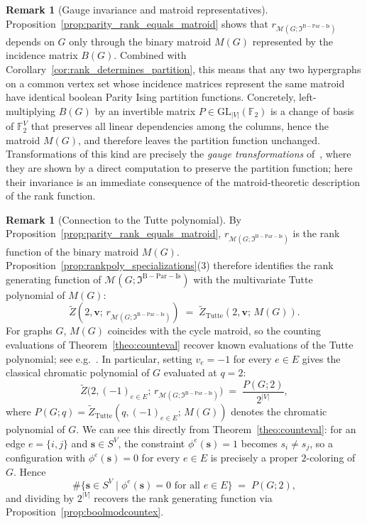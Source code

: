 \documentclass[11pt,reqno]{amsart}
\newcommand{\vecs}{\boldsymbol{s}}
\newcommand{\vecv}{\boldsymbol{v}}
\newcommand{\Mo}{\mathcal{M}}
\newcommand{\mcib}{\mathfrak{I}^{\mathrm{B-Par-Is}}}
\theoremstyle{plain}
\theoremstyle{definition}
\newtheorem{remark}[theorem]{Remark}
\numberwithin{equation}{section}
\begin{document}
\begin{remark}[Gauge invariance and matroid representatives]
\label{rem:gauge}
Proposition~\ref{prop:parity_rank_equals_matroid} shows that
$r_{\Mo(G; \mcib)}$ depends on $G$ only through the binary matroid $M(G)$ represented by the incidence matrix $B(G)$. Combined with Corollary~\ref{cor:rank_determines_partition}, this means that any two hypergraphs on a common vertex set whose incidence matrices represent the same matroid have identical boolean Parity Ising partition functions. Concretely, left-multiplying $B(G)$ by an invertible matrix $P \in \mathrm{GL}_{|V|}(\mathbb{F}_2)$ is a change of basis of $\mathbb{F}_2^{V}$ that preserves all linear dependencies among the columns, hence the matroid $M(G)$, and therefore leaves the partition function unchanged. Transformations of this kind are precisely the \emph{gauge transformations} of~\cite{spinmod}, where they are shown by a direct computation to preserve the partition function; here their invariance is an immediate consequence of the matroid-theoretic
description of the rank function. 
\end{remark}

\begin{remark}[Connection to the Tutte polynomial]
\label{rem:parity_tutte}
By Proposition~\ref{prop:parity_rank_equals_matroid}, $r_{\Mo(G; \mcib)}$ is the rank function of the binary matroid $M(G)$. Proposition~\ref{prop:rankpoly_specializations}(3) therefore identifies the rank generating function of $\Mo(G; \mcib)$ with the multivariate Tutte polynomial of $M(G)$:
\[
    \widetilde Z(2, \vecv;\, r_{\Mo(G; \mcib)})
    \;=\;
    \widetilde Z_{\mathrm{Tutte}}(2, \vecv;\, M(G)).
\]
For graphs $G$, $M(G)$ coincides with the cycle matroid, so the counting evaluations of Theorem~\ref{theo:counteval} recover known evaluations of the Tutte polynomial; see e.g.~\cite{ellis-monaghanHandbookTuttePolynomial2022}. In particular, setting $v_e = -1$ for every $e \in E$ gives the classical chromatic polynomial of $G$ evaluated at $q = 2$:
\[
    \widetilde Z\bigl(2, (-1)_{e \in E};\, r_{\Mo(G; \mcib)}\bigr)
    \;=\; \frac{P(G; 2)}{2^{|V|}},
\]
where $P(G; q) = \widetilde Z_{\mathrm{Tutte}}(q, (-1)_{e\in E};\, M(G))$ denotes the chromatic polynomial of $G$. We can see this directly from Theorem~\ref{theo:counteval}: for an edge $e = \{i,j\}$ and $\vecs \in S^V$, the constraint $\phi^e(\vecs) = 1$ becomes $s_i \neq s_j$, so a configuration with $\phi^e(\vecs) = 0$ for every $e \in E$ is precisely a proper $2$-coloring of $G$. Hence
\[
    \#\{\vecs \in S^V \mid \phi^e(\vecs) = 0 \text{ for all } e \in E\}
    \;=\; P(G; 2),
\]
and dividing by $2^{|V|}$ recovers the rank generating function via Proposition~\ref{prop:boolmodcountex}.
\end{remark}
\end{document}
